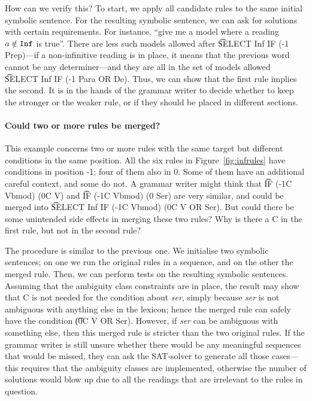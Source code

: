{{How can we verify this? To start, we apply all candidate rules to the same initial symbolic sentence. For the resulting symbolic sentence, we can ask for solutions with certain requirements.
For instance, ``give me a model where a reading $a \notin \texttt{Inf}$ is true''.
There are less such models allowed after \t{SELECT Inf IF (-1 Prep)}---if 
a non-infinitive reading is in place, it means that the previous word cannot be any determiner---and 
they are all in the set of models allowed \t{SELECT Inf IF (-1 Para OR De)}. Thus, we can show that the first rule implies the second. It is in the hands of the grammar writer to decide whether to keep the stronger or the weaker rule, or if they should be placed in different sections.


\paragraph{Could two or more rules be merged?} This example concerns two or more rules with the same target but different conditions in the same position. 
All the six rules in Figure~\ref{fig:infrules} have conditions in position -1; four of them also in 0. Some of them have an additional careful context, and some do not.
A grammar writer might think that \t{IF (-1C Vbmod) (0C V)} and \t{IF (-1C Vbmod) (0 Ser)} are very similar, and could be merged into \t{SELECT Inf IF (-1C Vbmod) (0C V OR Ser)}. But could there be some unintended side effects in merging these two rules? Why is there a C in the first rule, but not in the second rule? 

The procedure is similar to the previous one. We initialise two symbolic sentences; on one we run the original rules in a sequence, and on the other the merged rule. 
Then, we can perform tests on the resulting symbolic sentences. Assuming that the ambiguity class constraints are in place, the result may show that C is not needed for the condition about {\em ser}, simply because {\em ser} is not ambiguous with anything else in the lexicon; hence the merged rule can safely have the condition \t{(0C V OR Ser)}. However, if {\em ser} can be ambiguous with something else, then this merged rule is stricter than the two original rules. If the grammar writer is still unsure whether there would be any meaningful sequences that would be missed, they can ask the SAT-solver to generate all those cases---this requires that the ambiguity classes are implemented, 
otherwise the number of solutions would blow up due to all the readings that are irrelevant to the rules in question.

}}
